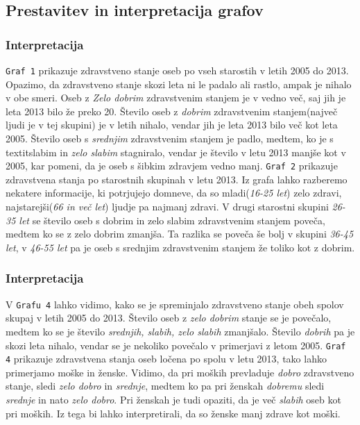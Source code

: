 \documentclass[11pt,a4paper]{article}
\begin{document}
\subsection{Prestavitev in interpretacija grafov}


\subsubsection{Interpretacija}
\verb+Graf 1+ prikazuje zdravstveno stanje oseb po vseh starostih v letih 2005 do 2013. Opazimo, da zdravstveno stanje skozi leta ni le padalo ali rastlo, ampak je nihalo v obe smeri. Oseb z \textit{Zelo dobrim} zdravstvenim stanjem je v vedno več, saj jih je leta 2013 bilo že preko 20. Število oseb  z \textit{dobrim} zdravstvenim stanjem(največ ljudi je v tej skupini) je v letih nihalo, vendar jih je leta 2013 bilo več kot leta 2005. Število oseb s \textit{srednjim} zdravstvenim stanjem je padlo, medtem, ko je s textit{slabim} in \textit{zelo slabim} stagniralo, vendar je število v letu 2013 manjše kot v 2005, kar pomeni, da je oseb s šibkim zdravjem vedno manj.
\verb+Graf 2+ prikazuje zdravstvena stanja po starostnih skupinah v letu 2013. Iz grafa lahko razberemo nekatere informacije, ki potrjujejo domneve, da so mladi(\textit{16-25 let}) zelo zdravi, najstarejši(\textit{66 in več let}) ljudje pa najmanj zdravi. V drugi starostni skupini \textit{26-35 let} se število oseb s dobrim in zelo slabim zdravstvenim stanjem poveča, medtem ko se z zelo dobrim zmanjša. Ta razlika se poveča še bolj v skupini \textit{36-45 let}, v \textit{46-55 let} pa je oseb s srednjim zdravstvenim stanjem že toliko kot z dobrim.

\subsubsection{Interpretacija}
V \verb+Grafu 4+ lahko vidimo, kako se je spreminjalo zdravstveno stanje obeh spolov skupaj v letih 2005 do 2013. Število oseb z  \textit{zelo dobrim} stanje se je povečalo, medtem ko se je število \textit{srednjih, slabih, zelo slabih} zmanjšalo. Število \textit{dobrih} pa je skozi leta nihalo, vendar se je nekoliko povečalo v primerjavi z letom 2005.
\verb+Graf 4+ prikazuje zdravstvena stanja oseb ločena po spolu v letu 2013, tako lahko primerjamo moške in ženske. Vidimo, da pri moških prevladuje \textit{dobro} zdravstveno stanje, sledi \textit{zelo dobro} in \textit{srednje}, medtem ko pa pri ženskah \textit{dobremu} sledi \textit{srednje} in nato \textit{zelo dobro}. Pri ženskah je tudi opaziti, da je več \textit{slabih} oseb kot pri moških. Iz tega bi lahko interpretirali, da so ženske manj zdrave kot moški.
\end{document}
